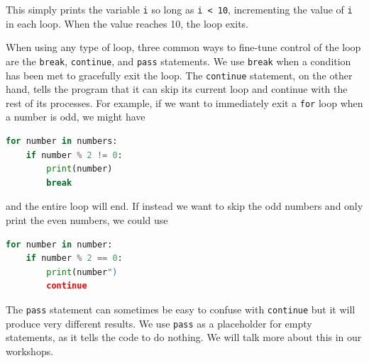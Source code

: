 \documentclass{tufte-book}
\begin{document}
This simply prints the variable \verb|i| so long as \verb|i < 10|, incrementing the value of \verb|i| in each loop. When the value reaches 10, the loop exits.

When using any type of loop, three common ways to fine-tune control of the loop are the \verb|break|, \verb|continue|, and \verb|pass| statements. We use \verb|break| when a condition has been met to gracefully exit the loop. The \verb|continue| statement, on the other hand, tells the program that it can skip its current loop and continue with the rest of its processes. For example, if we want to immediately exit a \verb|for| loop when a number is odd, we might have 

\begin{lstlisting}[language=Python, showstringspaces=false,
backgroundcolor=\color{lightgray}]
for number in numbers:
    if number % 2 != 0:
        print(number)
        break
\end{lstlisting}

\noindent and the entire loop will end. If instead we want to skip the odd numbers and only print the even numbers, we could use

\begin{lstlisting}[language=Python, showstringspaces=false,
backgroundcolor=\color{lightgray}]
for number in number:
    if number % 2 == 0:
        print(number")
        continue
\end{lstlisting}

The \verb|pass| statement can sometimes be easy to confuse with \verb|continue| but it will produce very different results. We use \verb|pass| as a placeholder for empty statements, as it tells the code to do nothing. We will talk more about this in our workshops. 




\end{document}
